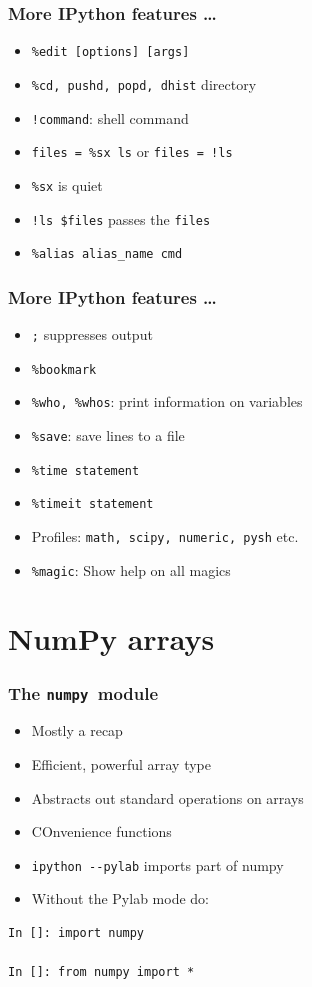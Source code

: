 \documentclass[14pt,compress]{beamer}
\newcounter{time}
\newcommand{\typ}[1]{\lstinline{#1}}
\begin{document}
\begin{frame}[fragile]
  \frametitle{More IPython features \ldots}
  \begin{itemize}
  \item \verb+%edit [options] [args]+
  \item \verb+%cd, pushd, popd, dhist+ directory
    \item \verb+!command+: shell command
    \item \verb+files = %sx ls+ or \verb+files = !ls+
    \item \verb+%sx+ is quiet
    \item \verb+!ls $files+ passes the \verb+files+
    \item \verb+%alias alias_name cmd+
  \end{itemize}
\end{frame}

\begin{frame}[fragile]
  \frametitle{More IPython features \ldots}
  \begin{itemize}
  \item \verb+;+ suppresses output
  \item \verb+%bookmark+
  \item \verb+%who, %whos+: print information on variables
  \item \verb+%save+: save lines to a file
  \item \verb+%time statement+
  \item \verb+%timeit statement+
  \item Profiles: \verb+math, scipy, numeric, pysh+ etc.
  \item \verb+%magic+: \alert{Show help on all magics}
  \end{itemize}
\end{frame}

\section{NumPy arrays}

\newcommand{\num}{\texttt{numpy}}


\begin{frame}[fragile]
  \frametitle{The \num\ module}
    \begin{itemize}
        \item \alert{Mostly a recap}
    \item Efficient, powerful array type
    \item Abstracts out standard operations on arrays
    \item COnvenience functions
    \item \typ{ipython --pylab} imports part of numpy
    \item Without the Pylab mode do:
    \end{itemize}
    \begin{lstlisting}
In []: import numpy

In []: from numpy import *
    \end{lstlisting}
\end{frame}
\end{document}
